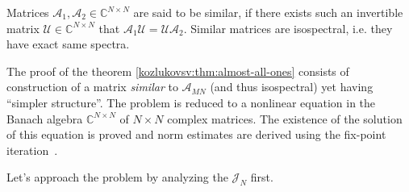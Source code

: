 Matrices \( \mathcal{A}_1, \mathcal{A}_2 \in\mathbb{C}^{N\times N} \)
    are said to be similar, if
    there exists such an invertible matrix \( \mathcal{U}\in\mathbb{C}^{N\times N} \)
    that \( \mathcal{A}_1 \mathcal{U} = \mathcal{U} \mathcal{A}_2 \).
Similar matrices are isospectral, i.e. they have exact same spectra.

The proof of the theorem \eqref{kozlukovsv:thm:almost-all-ones} consists of construction of a matrix
    \emph{similar} to \( \mathscr{A}_{MN} \) (and thus isospectral)
    yet having ``simpler structure''.
The problem is reduced to a nonlinear equation in the Banach algebra
    \( \mathbb{C}^{N\times N} \) of \( N\times N \) complex matrices.
The existence of the solution of this equation is proved
    and norm estimates are derived using the fix-point iteration~\cite{baskakov-harmonic}.

Let's approach the problem by analyzing the \( \mathcal{J}_N \) first.

